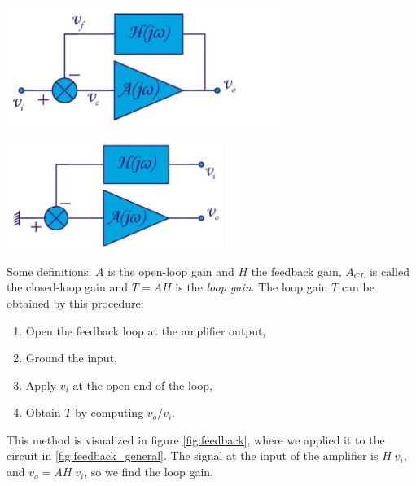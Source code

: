 \begin{minipage}{.5\textwidth}
	\centering
	\includegraphics[width=9cm]{figures/ch10/feedback_general.jpg}
	\label{fig:feedback_general}
\end{minipage}%
\begin{minipage}{.5\textwidth}
	\centering
	\includegraphics[width=7cm]{figures/ch10/feedback2.jpg}
	\label{fig:feedback}
\end{minipage}

Some definitions: $A$ is the open-loop gain and $H$ the feedback gain, $A_{CL}$ is called the  closed-loop gain and $T = AH$ is the \emph{loop gain}. The loop gain $T$ can be obtained by this procedure:
\begin{enumerate}
	\item Open the feedback loop at the amplifier output,
	\item Ground the input,
	\item Apply $v_i$ at the open end of the loop,
	\item Obtain $T$ by computing $v_o/v_i$.
\end{enumerate}
This method is visualized in figure \ref{fig:feedback}, where we applied it to the circuit in \ref{fig:feedback_general}. The signal at the input of the amplifier is $H\;v_i$, and $v_o = A H \; v_i$, so we find the loop gain.

